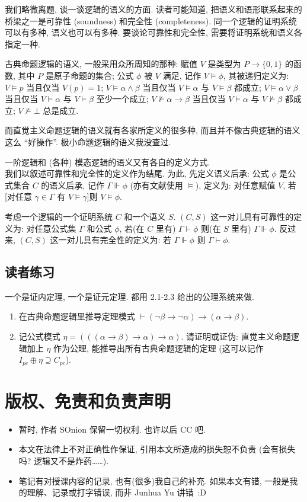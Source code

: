 \documentclass{article}
\def\a{\alpha}
\def\b{\beta}
\def\c{\gamma}
\def\C{\Gamma}
\begin{document}
我们略微离题, 谈一谈逻辑的语义的方面. 读者可能知道, 把语义和语形联系起来的桥梁之一是可靠性 (soundness) 和完全性 (completeness). 同一个逻辑的证明系统可以有多种, 语义也可以有多种. 要谈论可靠性和完全性, 需要将证明系统和语义各指定一种.

古典命题逻辑的语义, 一般采用众所周知的那种: 赋值 $V$ 是类型为 $P \to \{0,1\}$ 的函数, 其中 $P$ 是原子命题的集合; 公式 $\phi$ 被 $V$ 满足, 记作 $V\models \phi$, 其被递归定义为: $V\models p$ 当且仅当 $V(p)=1$; $V\models \a \land \b$ 当且仅当 $V\models \a$ 与 $V\models \b$ 都成立; $V\models \a \lor \b$ 当且仅当 $V\models \a$ 与 $V\models \b$ 至少一个成立; $V\not\models \a \to \b$ 当且仅当 $V\models \a$ 与 $V\not\models \b$ 都成立; $V\not\models\bot$ 总是成立.

而直觉主义命题逻辑的语义就有各家所定义的很多种, 而且并不像古典逻辑的语义这么 ``好操作''. 极小命题逻辑的语义我没查过. 

一阶逻辑和 (各种) 模态逻辑的语义又有各自的定义方式.\\

我们以叙述可靠性和完全性的定义作为结尾. 为此, 先定义语义后承: 公式 $\phi$ 是公式集合 $C$ 的语义后承, 记作 $\C \Vdash \phi$ (亦有文献使用 $\models$), 定义为: 对任意赋值 $V$, 若[对任意 $\c \in \C$ 有 $V \models \c$]则 $V \models \phi$.

考虑一个逻辑的一个证明系统 $C$ 和一个语义 $S$. $(C,S)$ 这一对儿具有可靠性的定义为: 对任意公式集 $\C$ 和公式 $\phi$, 若(在 $C$ 里有) $\C \vdash \phi$ 则(在 $S$ 里有) $\C \Vdash \phi$. 反过来, $(C,S)$ 这一对儿具有完全性的定义为: 若 $\C \Vdash \phi$ 则 $\C \vdash \phi$.

\subsection{读者练习} 

一个是证内定理, 一个是证元定理. 都用 2.1-2.3 给出的公理系统来做.

\begin{enumerate}
\item 在古典命题逻辑里推导定理模式 $\vdash (\neg \b \to \neg \a) \to (\a \to \b)$.
\item 记公式模式 $\eta = (((\a \to \b) \to \a) \to \a)$. 请证明或证伪: 直觉主义命题逻辑加上 $\eta$ 作为公理, 能推导出所有古典命题逻辑的定理 (这可以记作 $I_{pc} \oplus \eta \supseteq C_{pc}$).
\end{enumerate}


\section{版权、免责和负责声明}
\begin{itemize}
\item 暂时, 作者 SOnion 保留一切权利. 也许以后 CC 吧.
\item 本文在法律上不对正确性作保证, 引用本文所造成的损失恕不负责 (会有损失吗? 逻辑又不是炸药……).
\item 笔记有对授课内容的记录, 也有(很多)我自己的补充. 如果本文有错, 一般是我的理解、记录或打字错误, 而非 Junhua Yu 讲错~:D
\end{itemize}
\end{document}
